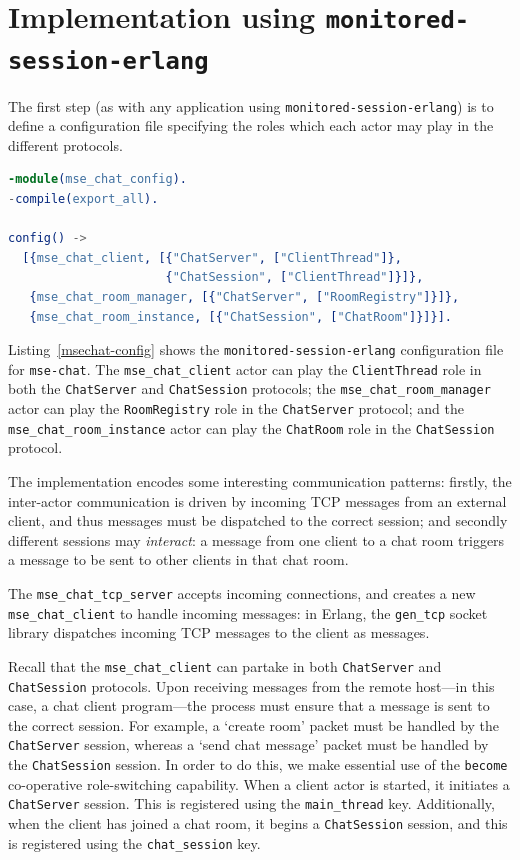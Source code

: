 \documentclass[a4paper]{article}
\newcommand{\mse}[0]{\texttt{monitored-session-erlang}}
\newcommand{\msechat}[0]{\texttt{mse-chat}}
\begin{document}
\section{Implementation using \mse{}}

The first step (as with any application using \mse{}) is to define a configuration file specifying the roles which each actor may play in the different protocols.

\begin{lstlisting}[language=erlang, label=msechat-config, caption=Configuration file for \msechat{}]
-module(mse_chat_config).
-compile(export_all).

config() ->
  [{mse_chat_client, [{"ChatServer", ["ClientThread"]},
                      {"ChatSession", ["ClientThread"]}]},
   {mse_chat_room_manager, [{"ChatServer", ["RoomRegistry"]}]},
   {mse_chat_room_instance, [{"ChatSession", ["ChatRoom"]}]}].
\end{lstlisting}

Listing~\ref{msechat-config} shows the \mse{} configuration file for \msechat{}. The \texttt{mse\_chat\_client} actor can play the \texttt{ClientThread} role in both the \texttt{ChatServer} and \texttt{ChatSession} protocols; the \texttt{mse\_chat\_room\_manager} actor can play the \texttt{RoomRegistry} role in the \texttt{ChatServer} protocol; and the \texttt{mse\_chat\_room\_instance} actor can play the \texttt{ChatRoom} role in the \texttt{ChatSession} protocol.

The implementation encodes some interesting communication patterns: firstly, the inter-actor communication is driven by incoming TCP messages from an external client, and thus messages must be dispatched to the correct session; and secondly different sessions may \emph{interact}: a message from one client to a chat room triggers a message to be sent to other clients in that chat room.


The \texttt{mse\_chat\_tcp\_server} accepts incoming connections, and creates a new \texttt{mse\_chat\_client} to handle incoming messages: in Erlang, the \texttt{gen\_tcp} socket library dispatches incoming TCP messages to the client as messages. 

Recall that the \texttt{mse\_chat\_client} can partake in both \texttt{ChatServer} and \texttt{ChatSession} protocols. Upon receiving messages from the remote host---in this case, a chat client program---the process must ensure that a message is sent to the correct session. For example, a `create room' packet must be handled by the \texttt{ChatServer} session, whereas a `send chat message' packet must be handled by the \texttt{ChatSession} session. In order to do this, we make essential use of the \texttt{become} co-operative role-switching capability. When a client actor is started, it initiates a \texttt{ChatServer} session. This is registered using the \texttt{main\_thread} key. Additionally, when the client has joined a chat room, it begins a \texttt{ChatSession} session, and this is registered using the \texttt{chat\_session} key.
\end{document}
